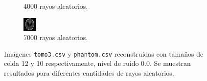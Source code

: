\documentclass[a4paper]{article}
\begin{document}
\begin{figure}
\begin{subfigure}{0.4\linewidth}
  \caption{4000 rayos aleatorios.}
\end{subfigure}%
\begin{subfigure}{0.4\linewidth}
  \centering
  \includegraphics[width=0.6\linewidth]{rayos/phantom-aleat7000}
  \caption{7000 rayos aleatorios.}
\end{subfigure}%

\caption{Imágenes \texttt{tomo3.csv} y \texttt{phantom.csv} reconstruidas con tamaños de celda 12 y 10 respectivamente, nivel de ruido 0.0. Se 
muestran resultados para diferentes cantidades de rayos aleatorios.}
\label{fig:muestras_aleat}
\end{figure}

\end{document}
